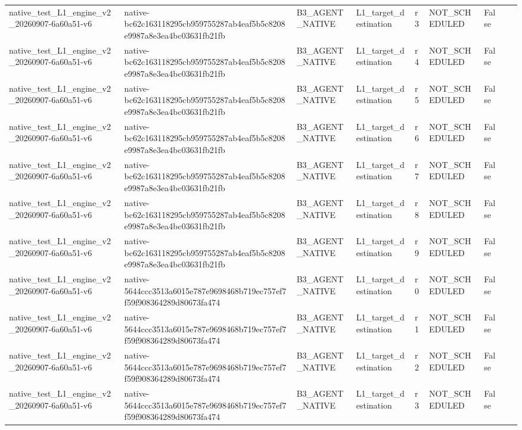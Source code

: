 \begin{tabular}{lllllllll}
native\_test\_L1\_engine\_v2\_20260907-6a60a51-v6 & native-bc62c163118295cb959755287ab4eaf5b5c8208e9987a8e3ea4bc03631fb21fb & B3\_AGENT\_NATIVE & L1\_target\_destination & r3 & NOT\_SCHEDULED & False &  &  \\
native\_test\_L1\_engine\_v2\_20260907-6a60a51-v6 & native-bc62c163118295cb959755287ab4eaf5b5c8208e9987a8e3ea4bc03631fb21fb & B3\_AGENT\_NATIVE & L1\_target\_destination & r4 & NOT\_SCHEDULED & False &  &  \\
native\_test\_L1\_engine\_v2\_20260907-6a60a51-v6 & native-bc62c163118295cb959755287ab4eaf5b5c8208e9987a8e3ea4bc03631fb21fb & B3\_AGENT\_NATIVE & L1\_target\_destination & r5 & NOT\_SCHEDULED & False &  &  \\
native\_test\_L1\_engine\_v2\_20260907-6a60a51-v6 & native-bc62c163118295cb959755287ab4eaf5b5c8208e9987a8e3ea4bc03631fb21fb & B3\_AGENT\_NATIVE & L1\_target\_destination & r6 & NOT\_SCHEDULED & False &  &  \\
native\_test\_L1\_engine\_v2\_20260907-6a60a51-v6 & native-bc62c163118295cb959755287ab4eaf5b5c8208e9987a8e3ea4bc03631fb21fb & B3\_AGENT\_NATIVE & L1\_target\_destination & r7 & NOT\_SCHEDULED & False &  &  \\
native\_test\_L1\_engine\_v2\_20260907-6a60a51-v6 & native-bc62c163118295cb959755287ab4eaf5b5c8208e9987a8e3ea4bc03631fb21fb & B3\_AGENT\_NATIVE & L1\_target\_destination & r8 & NOT\_SCHEDULED & False &  &  \\
native\_test\_L1\_engine\_v2\_20260907-6a60a51-v6 & native-bc62c163118295cb959755287ab4eaf5b5c8208e9987a8e3ea4bc03631fb21fb & B3\_AGENT\_NATIVE & L1\_target\_destination & r9 & NOT\_SCHEDULED & False &  &  \\
native\_test\_L1\_engine\_v2\_20260907-6a60a51-v6 & native-5644ccc3513a6015e787e9698468b719ec757ef7f59f908364289d80673fa474 & B3\_AGENT\_NATIVE & L1\_target\_destination & r0 & NOT\_SCHEDULED & False &  &  \\
native\_test\_L1\_engine\_v2\_20260907-6a60a51-v6 & native-5644ccc3513a6015e787e9698468b719ec757ef7f59f908364289d80673fa474 & B3\_AGENT\_NATIVE & L1\_target\_destination & r1 & NOT\_SCHEDULED & False &  &  \\
native\_test\_L1\_engine\_v2\_20260907-6a60a51-v6 & native-5644ccc3513a6015e787e9698468b719ec757ef7f59f908364289d80673fa474 & B3\_AGENT\_NATIVE & L1\_target\_destination & r2 & NOT\_SCHEDULED & False &  &  \\
native\_test\_L1\_engine\_v2\_20260907-6a60a51-v6 & native-5644ccc3513a6015e787e9698468b719ec757ef7f59f908364289d80673fa474 & B3\_AGENT\_NATIVE & L1\_target\_destination & r3 & NOT\_SCHEDULED & False &  &  \\

\end{tabular}
